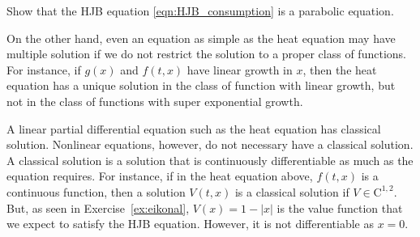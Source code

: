 \documentclass[11pt]{book}
\begin{document}
\begin{eg}
Show that the HJB equation \eqref{eqn:HJB_consumption} is a parabolic equation.
\end{eg}

On the other hand, even an equation as simple as the heat equation may have multiple solution if we do not restrict the solution to a proper class of functions. For instance, if $g(x)$ and $f(t,x)$ have linear growth in $x$, then the heat equation has a unique solution in the class of function with linear growth, but not in the class of functions  with super exponential growth.

A linear partial differential equation such as the heat equation has classical solution. Nonlinear equations, however, do not necessary have a classical solution. A classical solution is a solution that is continuously differentiable as much as the equation requires. For instance, if in the heat equation above, $f(t,x)$ is a continuous function, then a solution $V(t,x)$ is a classical solution if  $V\in\mathrm{C}^{1,2}$. But, as seen in Exercise~\ref{ex:eikonal}, $V(x)=1-|x|$ is the value function that we expect to satisfy the HJB equation. However, it is not differentiable as $x=0$.
\end{document}
